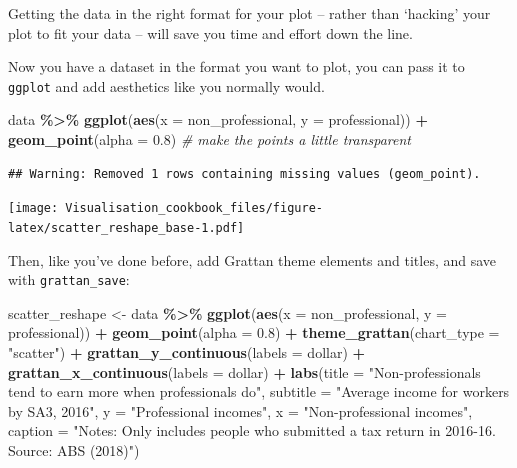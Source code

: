 \documentclass[
]{book}
\newenvironment{Shaded}{\begin{snugshade}}{\end{snugshade}}
\newcommand{\CommentTok}[1]{\textcolor[rgb]{0.56,0.35,0.01}{\textit{#1}}}
\newcommand{\DataTypeTok}[1]{\textcolor[rgb]{0.13,0.29,0.53}{#1}}
\newcommand{\FloatTok}[1]{\textcolor[rgb]{0.00,0.00,0.81}{#1}}
\newcommand{\KeywordTok}[1]{\textcolor[rgb]{0.13,0.29,0.53}{\textbf{#1}}}
\newcommand{\NormalTok}[1]{#1}
\newcommand{\OperatorTok}[1]{\textcolor[rgb]{0.81,0.36,0.00}{\textbf{#1}}}
\newcommand{\StringTok}[1]{\textcolor[rgb]{0.31,0.60,0.02}{#1}}
\begin{document}
Getting the data in the right format for your plot -- rather than `hacking' your plot to fit your data -- will save you time and effort down the line.

Now you have a dataset in the format you want to plot, you can pass it to \texttt{ggplot} and add aesthetics like you normally would.

\begin{Shaded}
\begin{Highlighting}[]
\NormalTok{data }\OperatorTok{\%\textgreater{}\%}\StringTok{ }
\StringTok{  }\KeywordTok{ggplot}\NormalTok{(}\KeywordTok{aes}\NormalTok{(}\DataTypeTok{x =}\NormalTok{ non\_professional,}
             \DataTypeTok{y =}\NormalTok{ professional)) }\OperatorTok{+}\StringTok{ }
\StringTok{  }\KeywordTok{geom\_point}\NormalTok{(}\DataTypeTok{alpha =} \FloatTok{0.8}\NormalTok{) }\CommentTok{\# make the points a little transparent}
\end{Highlighting}
\end{Shaded}

\begin{verbatim}
## Warning: Removed 1 rows containing missing values (geom_point).
\end{verbatim}

\texttt{[image: Visualisation\_cookbook\_files/figure-latex/scatter\_reshape\_base-1.pdf]}

Then, like you've done before, add Grattan theme elements and titles, and save with \texttt{grattan\_save}:

\begin{Shaded}
\begin{Highlighting}[]
\NormalTok{scatter\_reshape \textless{}{-}}\StringTok{ }\NormalTok{data }\OperatorTok{\%\textgreater{}\%}\StringTok{ }
\StringTok{  }\KeywordTok{ggplot}\NormalTok{(}\KeywordTok{aes}\NormalTok{(}\DataTypeTok{x =}\NormalTok{ non\_professional,}
             \DataTypeTok{y =}\NormalTok{ professional)) }\OperatorTok{+}\StringTok{ }
\StringTok{  }\KeywordTok{geom\_point}\NormalTok{(}\DataTypeTok{alpha =} \FloatTok{0.8}\NormalTok{) }\OperatorTok{+}\StringTok{ }
\StringTok{  }\KeywordTok{theme\_grattan}\NormalTok{(}\DataTypeTok{chart\_type =} \StringTok{"scatter"}\NormalTok{) }\OperatorTok{+}\StringTok{ }
\StringTok{  }\KeywordTok{grattan\_y\_continuous}\NormalTok{(}\DataTypeTok{labels =}\NormalTok{ dollar) }\OperatorTok{+}\StringTok{ }
\StringTok{  }\KeywordTok{grattan\_x\_continuous}\NormalTok{(}\DataTypeTok{labels =}\NormalTok{ dollar) }\OperatorTok{+}
\StringTok{  }\KeywordTok{labs}\NormalTok{(}\DataTypeTok{title =} \StringTok{"Non{-}professionals tend to earn more when professionals do"}\NormalTok{,}
       \DataTypeTok{subtitle =} \StringTok{"Average income for workers by SA3, 2016"}\NormalTok{,}
       \DataTypeTok{y =} \StringTok{"Professional incomes"}\NormalTok{,}
       \DataTypeTok{x =} \StringTok{"Non{-}professional incomes"}\NormalTok{,}
       \DataTypeTok{caption =} \StringTok{"Notes: Only includes people who submitted a tax return in 2016{-}16. Source: ABS (2018)"}\NormalTok{)}
\end{Highlighting}
\end{Shaded}
\end{document}
